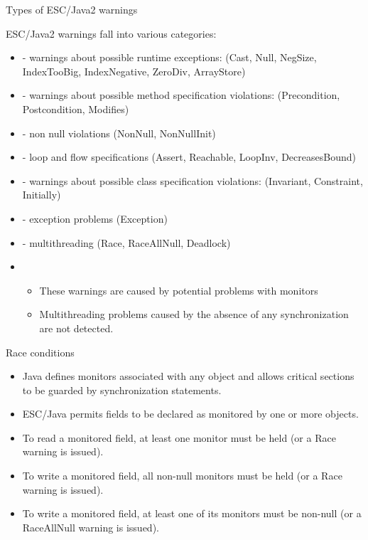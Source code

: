 \documentclass[
pdf,
nocolorBG,
slideColor,
cok,
]{prosper}
\begin{document}
\begin{slide}{Types of ESC/Java2 warnings}
\vspace*{-9ex}

ESC/Java2 warnings fall into various categories:
\begin{itemize}

\item[] - {\gray warnings about possible { runtime exceptions}:
(Cast, Null, NegSize, IndexTooBig, IndexNegative, ZeroDiv, ArrayStore)}

\item[] - {\gray warnings about possible method { specification violations}:
(Precondition, Postcondition, Modifies)}

\item[] - {\gray non null violations (NonNull, NonNullInit)}

\item[] - {\gray loop and flow specifications (Assert, Reachable, LoopInv, DecreasesBound)}

\item[] - { \gray warnings about possible class specification violations:
(Invariant, Constraint, Initially)}


\item[] - {\gray exception problems (Exception)}

\item[] - {\knalblue multithreading} (Race, RaceAllNull, Deadlock)
\item[]
\begin{itemize}
\item These warnings are caused by potential problems with monitors
\item Multithreading problems caused by the absence of any synchronization are not detected.
\end{itemize}

\end{itemize}
\end{slide}
\begin{slide}{Race conditions}

\vspace*{-6ex}

\begin{itemize}
\item Java defines monitors associated with any object and allows critical sections to be guarded by synchronization statements.
\item ESC/Java permits fields to be declared as {\blue monitored} by one or more objects.
\item To read a monitored field, at least one monitor must be held (or a Race warning is issued).
\item To write a monitored field, all non-null monitors must be held (or a Race warning is issued).
\item To write a monitored field, at least one of its monitors must be non-null (or a RaceAllNull warning is issued).
\end{itemize}
\end{slide}
\end{document}
